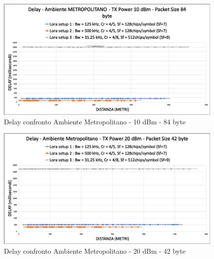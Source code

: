 \documentclass[12pt,a4paper,openright,twoside]{report}
\begin{document}
\begin{figure}[h]                      
\begin{center} 
\includegraphics[width=\textwidth]{DELAY_confronto_AM_10dBm_84byte.png}
\caption[Delay confronto Ambiente Metropolitano - 10 dBm - 84 byte]{Delay confronto Ambiente Metropolitano - 10 dBm - 84 byte}\label{fig:prima}
\end{center}
\end{figure}

\begin{figure}[h]                      
\begin{center} 
\includegraphics[width=\textwidth]{DELAY_confronto_AM_20dBm_42byte.png}
\caption[Delay confronto Ambiente Metropolitano - 20 dBm - 42 byte]{Delay confronto Ambiente Metropolitano - 20 dBm - 42 byte}\label{fig:prima}
\end{center}
\end{figure}
\end{document}
